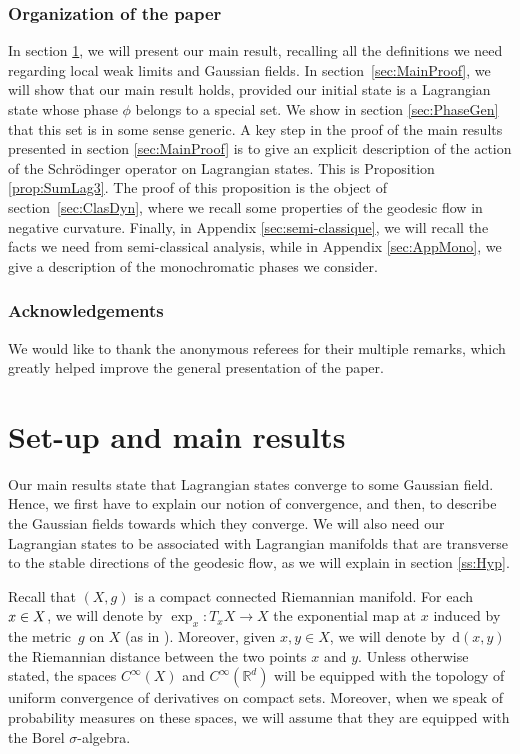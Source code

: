 \documentclass[10pt]{amsart}
\newcommand{\rd}{\,\mathrm{d}}
\theoremstyle{plain}
\theoremstyle{definition}
\newcommand{\R}{\mathbb{R}}
\begin{document}
\subsubsection*{Organization of the paper}
In section \ref{sec:main_results}, we will present our main result, recalling all the definitions we need regarding local weak limits and Gaussian fields. In section~\ref{sec:MainProof}, we will show that our main result holds, provided our initial state is a Lagrangian state whose phase $\phi$ belongs to a special set. We show in section \ref{sec:PhaseGen} that this set is in some sense generic. A key step in the proof of the main results presented in section \ref{sec:MainProof} is to give an explicit description of the action of the Schrödinger operator on Lagrangian states. This is Proposition \ref{prop:SumLag3}. The proof of this proposition is the object of section~\ref{sec:ClasDyn}, where we recall some properties of the geodesic flow in negative curvature.
Finally, in Appendix \ref{sec:semi-classique}, we will recall the facts we need from semi-classical analysis, while in Appendix \ref{sec:AppMono}, we give a description of the monochromatic phases we consider.

\subsubsection*{Acknowledgements}
We would like to thank the anonymous referees for their multiple remarks, which greatly helped improve the general presentation of the paper.

\section{Set-up and main results}\label{sec:main_results}
Our main results state that Lagrangian states converge to some Gaussian field. Hence, we first have to explain our notion of convergence, and then, to describe the Gaussian fields towards which they converge. We will also need our Lagrangian states to be associated with Lagrangian manifolds that are transverse to the stable directions of the geodesic flow, as we will explain in section \ref{ss:Hyp}.

Recall that $(X,g)$ is a compact connected Riemannian manifold. For each $x\in\nobreak X$, we will denote by $\exp_x:T_xX\to X$ the exponential map at $x$ induced by the metric~$g$ on $X$ (as in \cite[Def.\,1.4.3]{Jost}). Moreover, given $x,y\in X$, we will denote by $\rd (x,y)$ the Riemannian distance between the two points $x$ and $y$. Unless otherwise stated, the spaces $C^\infty(X)$ and $C^\infty(\R^d)$ will be equipped with the topology of uniform convergence of derivatives on compact sets. Moreover, when we speak of probability measures on these spaces, we will assume that they are equipped with the Borel $\sigma$-algebra.
\end{document}
